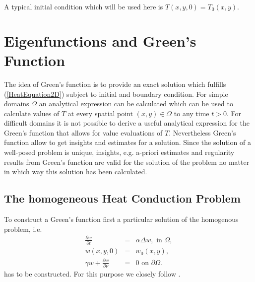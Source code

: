 \documentclass[a4paper,11pt]{article}
\theoremstyle{plain} %
\theoremstyle{definition} %
\theoremstyle{remark} %
\theoremstyle{remark}
\def\Temp{T}
\def\wTemp{w}
\def\Laplace{\Delta}
\begin{document}
A typical initial condition which will be used here is $ \Temp (x,y,0)= \Temp_0 (x, y) $. 

\section{Eigenfunctions and Green's Function}

The idea of Green's function is to provide an exact solution which  fulfills (\ref{HeatEquation2D}) subject to initial and boundary condition. For simple domains $\Omega $ an analytical expression can be calculated which can be used to calculate values of $ \Temp $ at every spatial point $(x,y) \in \Omega $ to any time $t>0 $. For difficult domains it is not possible to derive a useful analytical expression for the Green's function that allows for value evaluations of $\Temp$. Nevertheless Green's function allow to get insights and estimates for a solution. Since the solution of a well-posed problem is unique, insights, e.g. a-priori estimates and regularity results from Green's function are valid for the solution of the problem no matter in which way this solution has been calculated.

\subsection{The homogeneous Heat Conduction Problem}
To construct a Green's function first a particular solution of the homogenous problem, i.e.
\begin{eqnarray} \label{homogenHeatC}
\frac{\partial \wTemp }{\partial t } &=& \alpha\Laplace \wTemp  , \text{ in } \Omega , \\
\wTemp (x,y,0 ) & = & \wTemp_0(x,y) \label{homogenIC} , \\
\gamma \wTemp + \frac{\partial \wTemp }{\partial \nu } &=& 0 \text{ on } \partial \Omega  \label{homogenBC} .
\end{eqnarray}
has to be constructed. For this purpose we closely follow \cite[p. 50 f]{meinhold1990pdg}.
\end{document}
